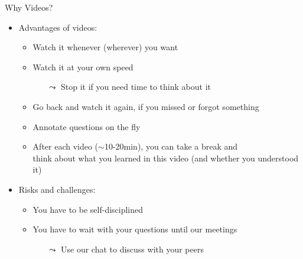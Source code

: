 \documentclass[aspectratio=169]{../latex_main/tntbeamer}  %
\begin{document}
\begin{frame}[c]{Why Videos?}

\begin{itemize}
  \item Advantages of videos:
  \begin{itemize}
      \item Watch it whenever (wherever) you want
      \item Watch it at your own speed
      \begin{itemize}
          \item[$\leadsto$] Stop it if you need time to think about it
      \end{itemize}
      \item Go back and watch it again, if you missed or forgot something
      \item Annotate questions on the fly %
      \item After each video ($\sim$10-20min), you can take a break and\\ think about what you learned in this video (and whether you understood it)
  \end{itemize}
  \medskip
  \pause
  \item Risks and challenges:
  \begin{itemize}
      \item You have to be self-disciplined 
      \item You have to wait with your questions until our meetings
      \begin{itemize}
          \item[$\leadsto$] Use our chat to discuss with your peers
      \end{itemize}
  \end{itemize}
\end{itemize}

\end{frame}
\end{document}
